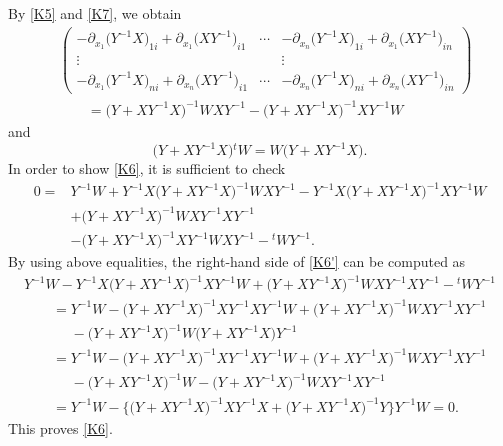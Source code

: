 \documentclass[10pt,a4paper]{amsart}
\numberwithin{equation}{section}
\begin{document}
By \eqref{K5} and \eqref{K7}, we obtain
\begin{align*}
&\begin{pmatrix}
-\partial_{x_1}\bigl(Y^{-1}X\bigr)_{1i}+\partial_{x_1}\bigl(XY^{-1}\bigr)_{i1} & \cdots & -\partial_{x_n}\bigl(Y^{-1}X\bigr)_{1i}+\partial_{x_1}\bigl(XY^{-1}\bigr)_{in} \\
\vdots & & \vdots \\
-\partial_{x_1}\bigl(Y^{-1}X\bigr)_{ni}+\partial_{x_n}\bigl(XY^{-1}\bigr)_{i1} & \cdots & -\partial_{x_n}\bigl(Y^{-1}X\bigr)_{ni}+\partial_{x_n}\bigl(XY^{-1}\bigr)_{in}
\end{pmatrix}\\
&\qquad=\bigl(Y+XY^{-1}X\bigr)^{-1}WXY^{-1}-\bigl(Y+XY^{-1}X\bigr)^{-1}XY^{-1}W
\end{align*}
and
\[
\bigl(Y+XY^{-1}X\bigr){}^tW=W\bigl(Y+XY^{-1}X\bigr).
\]
In order to show \eqref{K6}, it is sufficient to check
\begin{align}
0={}&Y^{-1}W+Y^{-1}X\bigl(Y+XY^{-1}X\bigr)^{-1}WXY^{-1}-Y^{-1}X\bigl(Y+XY^{-1}X\bigr)^{-1}XY^{-1}W\nonumber\\
&+\bigl(Y+XY^{-1}X\bigr)^{-1}WXY^{-1}XY^{-1}\nonumber\\
&-\bigl(Y+XY^{-1}X\bigr)^{-1}XY^{-1}WXY^{-1}-{}^tWY^{-1}.\label{K6'}
\end{align}
By using above equalities, the right-hand side of \eqref{K6'} can be computed as
\begin{gather*}
Y^{-1}W-Y^{-1}X\bigl(Y+XY^{-1}X\bigr)^{-1}XY^{-1}W+\bigl(Y+XY^{-1}X\bigr)^{-1}WXY^{-1}XY^{-1}-{}^tWY^{-1}\\
\qquad=Y^{-1}W-\bigl(Y+XY^{-1}X\bigr)^{-1}XY^{-1}XY^{-1}W+\bigl(Y+XY^{-1}X\bigr)^{-1}WXY^{-1}XY^{-1}\\
\phantom{\qquad=}{}-\bigl(Y+XY^{-1}X\bigr)^{-1}W\bigl(Y+XY^{-1}X\bigr)Y^{-1}\\
\qquad=Y^{-1}W-\bigl(Y+XY^{-1}X\bigr)^{-1}XY^{-1}XY^{-1}W+\bigl(Y+XY^{-1}X\bigr)^{-1}WXY^{-1}XY^{-1}\\
\phantom{\qquad=}{}-\bigl(Y+XY^{-1}X\bigr)^{-1}W-\bigl(Y+XY^{-1}X\bigr)^{-1}WXY^{-1}XY^{-1}\\
\qquad=Y^{-1}W-\big\{\bigl(Y+XY^{-1}X\bigr)^{-1}XY^{-1}X +\bigl(Y+XY^{-1}X\bigr)^{-1}Y \big\}Y^{-1}W=0.
\end{gather*}
This proves \eqref{K6}.
\end{document}
